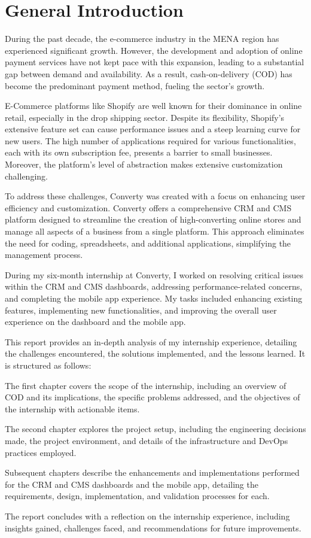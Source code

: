 \chapter{General Introduction}

During the past decade, the e-commerce industry in the MENA region has experienced significant growth. However, the development and adoption of online payment services have not kept pace with this expansion, leading to a substantial gap between demand and availability. As a result, cash-on-delivery (COD) has become the predominant payment method, fueling the sector's growth.

E-Commerce platforms like Shopify are well known for their dominance in online retail, especially in the drop shipping sector. Despite its flexibility, Shopify’s extensive feature set can cause performance issues and a steep learning curve for new users. The high number of applications required for various functionalities, each with its own subscription fee, presents a barrier to small businesses. Moreover, the platform’s level of abstraction makes extensive customization challenging.

To address these challenges, Converty was created with a focus on enhancing user efficiency and customization. Converty offers a comprehensive CRM and CMS platform designed to streamline the creation of high-converting online stores and manage all aspects of a business from a single platform. This approach eliminates the need for coding, spreadsheets, and additional applications, simplifying the management process.

During my six-month internship at Converty, I worked on resolving critical issues within the CRM and CMS dashboards, addressing performance-related concerns, and completing the mobile app experience. My tasks included enhancing existing features, implementing new functionalities, and improving the overall user experience on the dashboard and the mobile app.
\newline

This report provides an in-depth analysis of my internship experience, detailing the challenges encountered, the solutions implemented, and the lessons learned. It is structured as follows:
\newline

The first chapter covers the scope of the internship, including an overview of COD and its implications, the specific problems addressed, and the objectives of the internship with actionable items.
\newline

The second chapter explores the project setup, including the engineering decisions made, the project environment, and details of the infrastructure and DevOps practices employed.
\newline

Subsequent chapters describe the enhancements and implementations performed for the CRM and CMS dashboards and the mobile app, detailing the requirements, design, implementation, and validation processes for each.
\newline

The report concludes with a reflection on the internship experience, including insights gained, challenges faced, and recommendations for future improvements.
